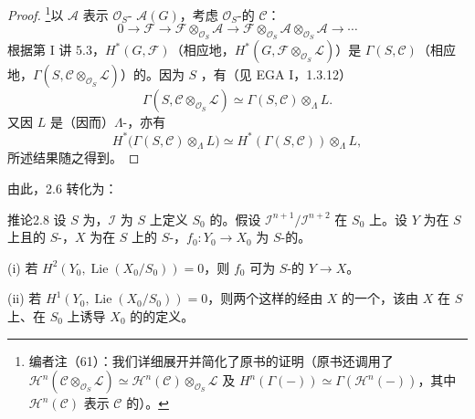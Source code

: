 \begin{proof}
\footnote{编者注（61）：我们详细展开并简化了原书的证明（原书还调用了 $\mathcal H^n(\mathcal C\otimes_{\mathcal O_S}\mathcal L)\simeq\mathcal H^n(\mathcal C)\otimes_{\mathcal O_S}\mathcal L$ 及 $H^n(\Gamma(-))\simeq\Gamma(\mathcal H^n(-))$，其中 $\mathcal H^n(\mathcal C)$ 表示 $\mathcal C$ 的）。}以 $\mathcal A$ 表示 $\mathcal O_S$- $\mathcal A(G)$，考虑 $\mathcal O_S$-的 $\mathcal C$：
\[
 0\longrightarrow\mathcal F\longrightarrow\mathcal F\otimes_{\mathcal O_S}\mathcal A
 \longrightarrow\mathcal F\otimes_{\mathcal O_S}\mathcal A\otimes_{\mathcal O_S}\mathcal A\longrightarrow\cdots
\]
根据第 I 讲 5.3，$H^*(G,\mathcal F)$（相应地，$H^*(G,\mathcal F\otimes_{\mathcal O_S}\mathcal L)$）是 $\Gamma(S,\mathcal C)$（相应地，$\Gamma(S,\mathcal C\otimes_{\mathcal O_S}\mathcal L)$）的。因为 $S$ ，有（见 EGA I，1.3.12）
\[
 \Gamma(S,\mathcal C\otimes_{\mathcal O_S}\mathcal L)
 \simeq\Gamma(S,\mathcal C)\otimes_\Lambda L.
\]
又因 $L$ 是（因而）$\Lambda$-，亦有
\[
 H^*\bigl(\Gamma(S,\mathcal C)\otimes_\Lambda L\bigr)
 \simeq H^*(\Gamma(S,\mathcal C))\otimes_\Lambda L,
\]
所述结果随之得到。
\end{proof}
由此，2.6 转化为：
\begin{SGAresult}{推论}{2.8}
设 $S$ 为，$\mathcal I$ 为 $S$ 上定义 $S_0$ 的。假设 $\mathcal I^{n+1}/\mathcal I^{n+2}$ 在 $S_0$ 上。设 $Y$ 为在 $S$ 上且的 $S$-，$X$ 为在 $S$ 上的 $S$-，$f_0:Y_0\to X_0$ 为 $S$-的。

(i) 若 $H^2(Y_0,\operatorname{Lie}(X_0/S_0))=0$，则 $f_0$ 可为 $S$-的 $Y\to X$。

(ii) 若 $H^1(Y_0,\operatorname{Lie}(X_0/S_0))=0$，则两个这样的经由 $X$ 的一个，该由 $X$ 在 $S$ 上、在 $S_0$ 上诱导 $X_0$ 的的定义。
\end{SGAresult}
